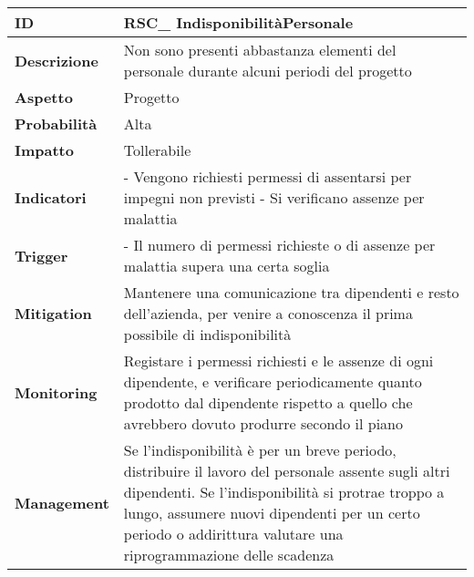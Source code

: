 \clearpage
\begin{tabular}{|p{2.2cm}|p{9.6cm}| }
 	\hline
	\textbf{ID} & RSC\_ IndisponibilitàPersonale\\ [0.5ex] 
	\hline
	\textbf{Descrizione} & Non sono presenti abbastanza elementi del personale durante alcuni periodi del progetto\\ 
	\hline
	\textbf{Aspetto} &  Progetto \\
	\hline
	\textbf{Probabilità} &  Alta \\ 
	\hline
	\textbf{Impatto} &  Tollerabile \\ 
	\hline
	\textbf{Indicatori} & - Vengono richiesti permessi di assentarsi per impegni non previsti\newline
				  - Si verificano assenze per malattia\\
	\hline
	\textbf{Trigger} & - Il numero di permessi richieste o di assenze per malattia supera una certa soglia\\
	\hline
	\textbf{Mitigation} & Mantenere una comunicazione tra dipendenti e resto dell'azienda, per venire a conoscenza il prima possibile di indisponibilità \\ 
	\hline
	\textbf{Monitoring} & Registare i permessi richiesti e le assenze di ogni dipendente, e verificare periodicamente quanto prodotto dal dipendente rispetto a quello che avrebbero dovuto produrre secondo il piano\\ 
	\hline
	\textbf{Management} & Se l'indisponibilità è per un breve periodo, distribuire il lavoro del personale assente sugli altri dipendenti. Se l'indisponibilità si protrae troppo a lungo, assumere nuovi dipendenti per un certo periodo o addirittura valutare una riprogrammazione delle scadenza\\ 
	\hline
\end{tabular}


